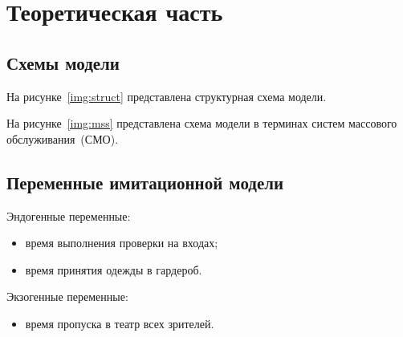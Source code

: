 \chapter{Теоретическая часть}

\section{Схемы модели}

На рисунке~\ref{img:struct} представлена структурная схема модели.


На рисунке~\ref{img:mss} представлена схема модели в терминах систем массового
обслуживания~(СМО).

\vspace{-0.5cm}
\vspace{-0.5cm}

\section{Переменные имитационной модели}

Эндогенные переменные:
\begin{itemize}
    \item время выполнения проверки на входах;
    \item время принятия одежды в гардероб.
\end{itemize}

Экзогенные переменные:
\begin{itemize}
    \item время пропуска в театр всех зрителей.
\end{itemize}

